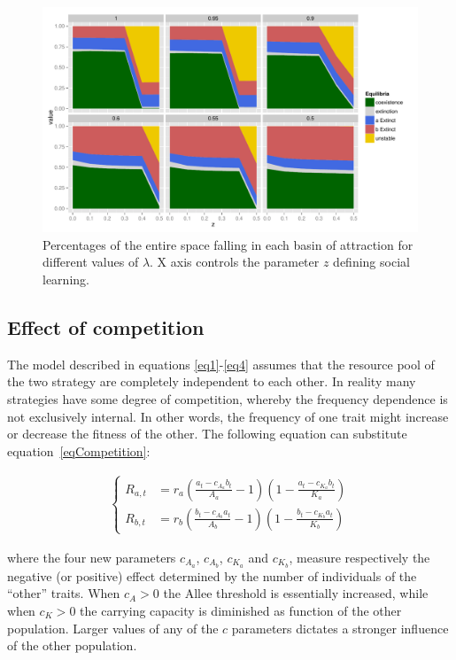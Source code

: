 \documentclass[preprint,authoryear]{elsarticle}
\begin{document}
\begin{figure}[h!]
  \centering
      \includegraphics[width=\textwidth]{./figures/figure6}
  \caption{Percentages of the entire space falling in each basin of attraction for different values of $\lambda$. X axis controls the parameter $z$ defining social learning.}
    \label{fig:percentages}
\end{figure}


\subsection{Effect of competition}

The model described in equations \ref{eq1}-\ref{eq4} assumes that the resource pool of the two strategy are completely independent to each other. In reality many strategies have some degree of competition, whereby the frequency dependence is not exclusively internal. In other words, the frequency of one trait might increase or decrease the fitness of the other. The following equation can substitute equation~\eqref{eqCompetition}: 

\begin{align}
\begin{cases}
R_{a,t}& = r_a (\frac{a_t-c_{A_a}b_t}{A_a}-1)(1-\frac{a_t-c_{K_a}b_t}{K_a})\\
R_{b,t}& = r_b (\frac{b_t-c_{A_b}a_t}{A_b}-1)(1-\frac{b_t-c_{K_b}a_t}{K_b}) 
\end{cases}
\label{eqCompetition}
\end{align}

where the four new parameters $c_{A_a}$, $c_{A_b}$, $c_{K_a}$ and $c_{K_b}$, measure respectively the negative (or positive) effect determined by the number of individuals of the “other” traits. When $c_{A}>0$ the Allee threshold is essentially increased, while when $c_{K}>0$ the carrying capacity is diminished as function of the other population. Larger values of any of the $c$ parameters dictates a stronger influence of the other population. 
\end{document}
